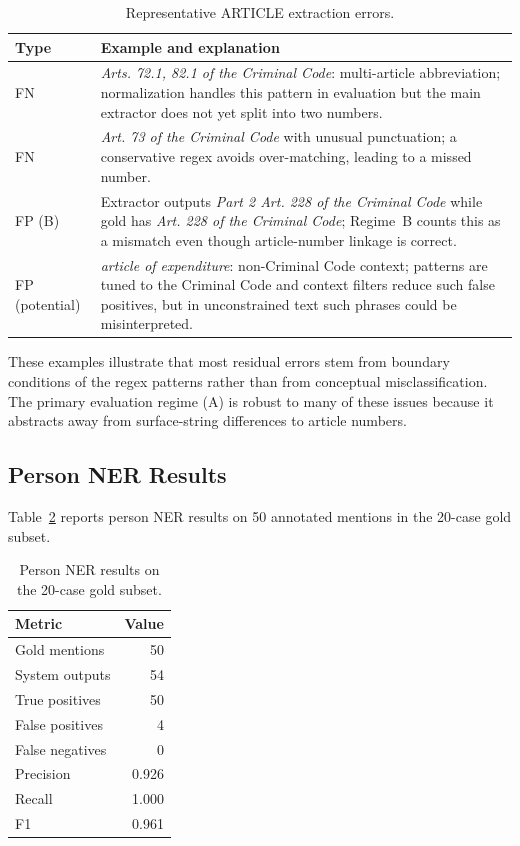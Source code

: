 \documentclass[11pt]{article}
\begin{document}
\begin{table}[t]
\centering
\begin{tabular}{p{1.5cm}p{5.5cm}}
\hline
Type & Example and explanation \\
\hline
FN & \textit{Arts. 72.1, 82.1 of the Criminal Code}: multi-article abbreviation; normalization handles this pattern in evaluation but the main extractor does not yet split into two numbers. \\
FN & \textit{Art. 73 of the Criminal Code} with unusual punctuation; a conservative regex avoids over-matching, leading to a missed number. \\
FP (B) & Extractor outputs \textit{Part 2 Art. 228 of the Criminal Code} while gold has \textit{Art. 228 of the Criminal Code}; Regime~B counts this as a mismatch even though article-number linkage is correct. \\
FP (potential) & \textit{article of expenditure}: non-Criminal Code context; patterns are tuned to the Criminal Code and context filters reduce such false positives, but in unconstrained text such phrases could be misinterpreted. \\
\hline
\end{tabular}
\caption{Representative ARTICLE extraction errors.}
\label{tab:errors}
\end{table}

These examples illustrate that most residual errors stem from boundary conditions of the regex patterns rather than from conceptual misclassification. The primary evaluation regime (A) is robust to many of these issues because it abstracts away from surface-string differences to article numbers.

\subsection{Person NER Results}

Table~\ref{tab:person} reports person NER results on 50 annotated mentions in the 20-case gold subset.

\begin{table}[t]
\centering
\begin{tabular}{lr}
\hline
Metric & Value \\
\hline
Gold mentions & 50 \\
System outputs & 54 \\
True positives & 50 \\
False positives & 4 \\
False negatives & 0 \\
Precision & 0.926 \\
Recall & 1.000 \\
F1 & 0.961 \\
\hline
\end{tabular}
\caption{Person NER results on the 20-case gold subset.}
\label{tab:person}
\end{table}
\end{document}
